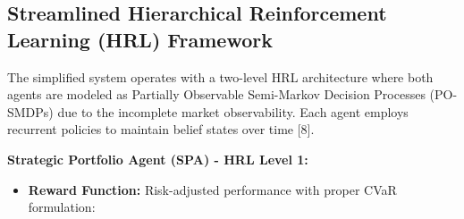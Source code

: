\documentclass[11pt,a4paper]{article}
\begin{document}
\subsection{Streamlined Hierarchical Reinforcement Learning (HRL) Framework}

The simplified system operates with a two-level HRL architecture where both agents are modeled as Partially Observable Semi-Markov Decision Processes (PO-SMDPs) due to the incomplete market observability. Each agent employs recurrent policies to maintain belief states over time [8].

\textbf{Strategic Portfolio Agent (SPA) - HRL Level 1:}

\begin{itemize}
\begin{equation}
\item   \textbf{State Space ($S_{\text{\1}}$):} ELTRA intelligence signals (forecasts, regime probabilities, confidence scores), current portfolio state $\mathbf{w}_t$, cash position, performance metrics, risk indicators, and market volatility measures.
\end{equation}

\begin{equation}
\item   \textbf{Action Space ($A_{\text{\1}}$):} Strategic allocation decisions including position sizing targets $\mathbf{w}^{target}$, risk exposure levels $\rho_{\text{\1}}$, rebalancing triggers, and risk constraint parameters passed to EOA.
\end{equation}

\item   \textbf{Reward Function:} Risk-adjusted performance with proper CVaR formulation:
\end{itemize}
\end{document}
